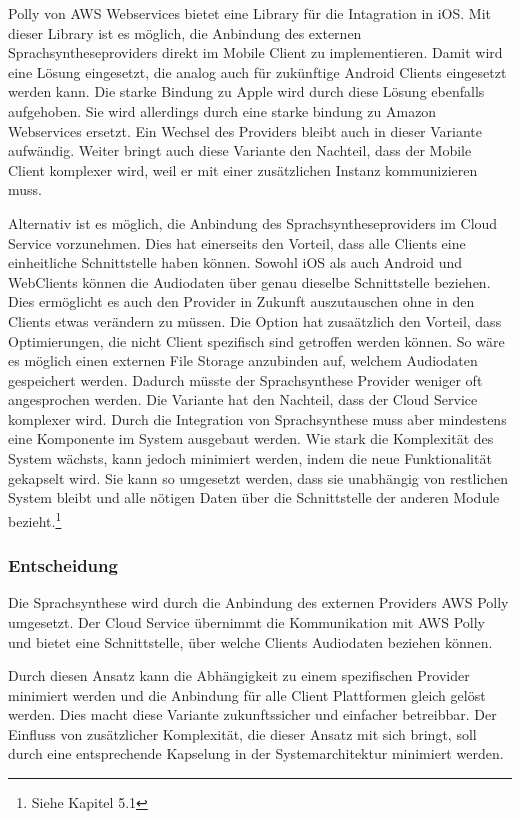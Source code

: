 Polly von AWS Webservices bietet eine Library für die Intagration in iOS. \cite{aws_polly_ios}
Mit dieser Library ist es möglich, die Anbindung des externen Sprachsyntheseproviders direkt im Mobile Client zu implementieren.
Damit wird eine Lösung eingesetzt, die analog auch für zukünftige Android Clients eingesetzt werden kann.
Die starke Bindung zu Apple wird durch diese Lösung ebenfalls aufgehoben.
Sie wird allerdings durch eine starke bindung zu Amazon Webservices ersetzt.
Ein Wechsel des Providers bleibt auch in dieser Variante aufwändig.
Weiter bringt auch diese Variante den Nachteil, dass der Mobile Client komplexer wird, weil er mit einer zusätzlichen Instanz kommunizieren muss.

Alternativ ist es möglich, die Anbindung des Sprachsyntheseproviders im Cloud Service vorzunehmen.
Dies hat einerseits den Vorteil, dass alle Clients eine einheitliche Schnittstelle haben können.
Sowohl iOS als auch Android und WebClients können die Audiodaten über genau dieselbe Schnittstelle beziehen.
Dies ermöglicht es auch den Provider in Zukunft auszutauschen ohne in den Clients etwas verändern zu müssen.
Die Option hat zusaätzlich den Vorteil, dass Optimierungen, die nicht Client spezifisch sind getroffen werden können.
So wäre es möglich einen externen File Storage anzubinden auf, welchem Audiodaten gespeichert werden.
Dadurch müsste der Sprachsynthese Provider weniger oft angesprochen werden.
Die Variante hat den Nachteil, dass der Cloud Service komplexer wird.
Durch die Integration von Sprachsynthese muss aber mindestens eine Komponente im System ausgebaut werden.
Wie stark die Komplexität des System wächsts, kann jedoch minimiert werden, indem die neue Funktionalität gekapselt wird.
Sie kann so umgesetzt werden, dass sie unabhängig von restlichen System bleibt und alle nötigen Daten über die Schnittstelle der anderen Module bezieht.\footnote{Siehe Kapitel 5.1}

\subsubsection*{Entscheidung}

Die Sprachsynthese wird durch die Anbindung des externen Providers AWS Polly umgesetzt.
Der Cloud Service übernimmt die Kommunikation mit AWS Polly und bietet eine Schnittstelle, über welche Clients Audiodaten beziehen können.

Durch diesen Ansatz kann die Abhängigkeit zu einem spezifischen Provider minimiert werden und die Anbindung für alle Client Plattformen gleich gelöst werden.
Dies macht diese Variante zukunftssicher und einfacher betreibbar.
Der Einfluss von zusätzlicher Komplexität, die dieser Ansatz mit sich bringt, soll durch eine entsprechende Kapselung in der Systemarchitektur minimiert werden.

\clearpage
